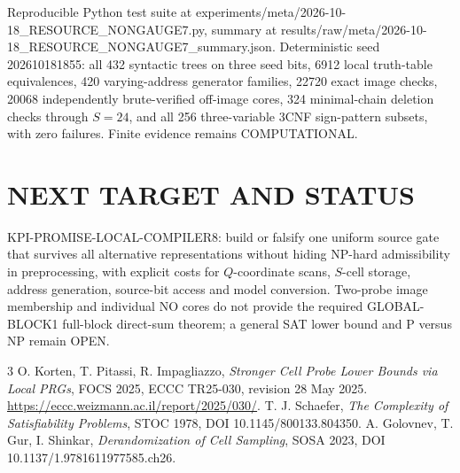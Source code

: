 \documentclass[11pt]{article}
\begin{document}
Reproducible Python test suite at experiments/meta/2026-10-18_RESOURCE_NONGAUGE7.py, summary at results/raw/meta/2026-10-18_RESOURCE_NONGAUGE7_summary.json. Deterministic seed 202610181855: all 432 syntactic trees on three seed bits, 6912 local truth-table equivalences, 420 varying-address generator families, 22720 exact image checks, 20068 independently brute-verified off-image cores, 324 minimal-chain deletion checks through \(S=24\), and all 256 three-variable 3CNF sign-pattern subsets, with zero failures. Finite evidence remains COMPUTATIONAL.
\section{NEXT TARGET AND STATUS}
KPI-PROMISE-LOCAL-COMPILER8: build or falsify one uniform source gate that survives all alternative representations without hiding NP-hard admissibility in preprocessing, with explicit costs for \(Q\)-coordinate scans, \(S\)-cell storage, address generation, source-bit access and model conversion. Two-probe image membership and individual NO cores do not provide the required GLOBAL-BLOCK1 full-block direct-sum theorem; a general SAT lower bound and P versus NP remain OPEN.
\begin{thebibliography}{3}
 O. Korten, T. Pitassi, R. Impagliazzo, \emph{Stronger Cell Probe Lower Bounds via Local PRGs}, FOCS 2025, ECCC TR25-030, revision 28 May 2025. \url{https://eccc.weizmann.ac.il/report/2025/030/}.
 T. J. Schaefer, \emph{The Complexity of Satisfiability Problems}, STOC 1978, DOI 10.1145/800133.804350.
 A. Golovnev, T. Gur, I. Shinkar, \emph{Derandomization of Cell Sampling}, SOSA 2023, DOI 10.1137/1.9781611977585.ch26.
\end{thebibliography}
\end{document}

